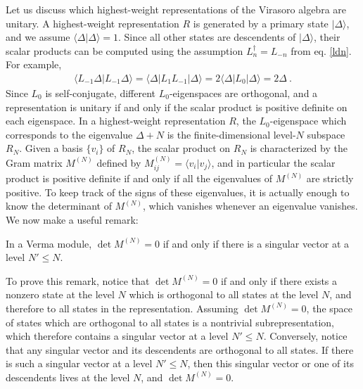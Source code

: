 \documentclass[12pt,a4paper,notitlepage]{report}
\numberwithin{equation}{section}
\theoremstyle{break}
\begin{document}
Let us discuss which highest-weight representations of the Virasoro algebra are unitary.
A highest-weight representation $R$ is generated by a primary state $|\Delta\rangle$, and we assume $\langle \Delta|\Delta\rangle =1$.
Since all other states are descendents of $|\Delta\rangle$, their scalar products can be computed using the assumption $L_n^\dagger = L_{-n}$ from eq. \eqref{ldn}.
For example,
\begin{align}
 \langle L_{-1} \Delta|L_{-1}\Delta\rangle = \langle \Delta |L_1 L_{-1}|\Delta\rangle = 2\langle \Delta|L_0|\Delta\rangle = 2\Delta\ . 
\label{levo} 
\end{align}
Since $L_0$ is self-conjugate, different $L_0$-eigenspaces are orthogonal, and a representation is unitary if and only if the scalar product is positive definite on each eigenspace. 
In a highest-weight representation $R$, the $L_0$-eigenspace which corresponds to the eigenvalue $\Delta+N$ is the finite-dimensional level-$N$ subspace $R_N$.
Given a basis $\{v_i\}$ of $R_N$, the scalar product on $R_N$ is characterized by the Gram matrix $M^{(N)}$ defined by $M^{(N)}_{ij}=\langle v_i|v_j\rangle$, and in particular the scalar product is positive definite if and only if all the eigenvalues of $M^{(N)}$ are strictly positive.
To keep track of the signs of these eigenvalues, it is actually enough to know the determinant of $M^{(N)}$, which vanishes whenever an eigenvalue vanishes. 
We now make a useful remark:
\begin{center}
 \begin{minipage}{0.9\textwidth}
 In a Verma module, $\det M^{(N)}=0$ if and only if there is a singular vector at a level $N'\leq N$.  
 \end{minipage}
\end{center}
To prove this remark, notice that $\det M^{(N)}=0$ if and only if there exists a nonzero state at the level $N$ which is orthogonal to all states at the level $N$, and therefore to all states in the representation.
Assuming $\det M^{(N)}=0$, the space of states which are orthogonal to all states is a nontrivial subrepresentation, which therefore contains a singular vector at a level $N'\leq N$. 
Conversely, notice that any singular vector and its descendents are orthogonal to all states.
If there is such a singular vector at a level $N'\leq N$, then this singular vector or one of its descendents lives at the level $N$, and $\det M^{(N)}=0$.
\end{document}
